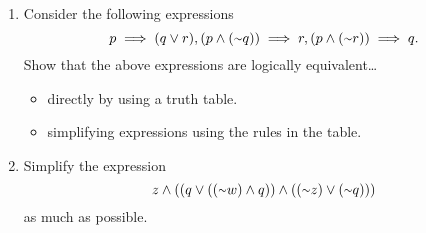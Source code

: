 \begin{enumerate}
	\item Consider the following expressions
	\[p \implies (q \lor r), (p \land (\shortsim q)) \implies r, (p \land (\shortsim r)) \implies q.\]
	Show that the above expressions are logically equivalent\ldots
	\begin{itemize}
		\item directly by using a truth table.
		\item simplifying expressions using the rules in the table.
	\end{itemize}
	
	\item Simplify the expression
	\[z \land ((q \lor ((\shortsim w) \land q )) \land (( \shortsim z) \lor (\shortsim q)))\]
	as much as possible.
\end{enumerate}
